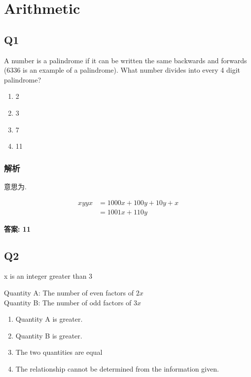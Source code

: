 \chapter{Arithmetic}

\section{Q1}

  A number is a palindrome if it can be written the same backwards and
  forwards (6336 is an example of a palindrome). What number divides into every
  4 digit palindrome?

  \begin{enumerate}
    \item 2
    \item 3
    \item 7
    \item 11
  \end{enumerate}

  \subsection{解析}

    意思为.

    \begin{align*}
      xyyx &= 1000x + 100y + 10y + x \\
      &= 1001x + 110 y
    \end{align*}

    \textbf{答案: 11}

\section{Q2}

  x is an integer greater than 3

  \begin{center}
    Quantity A: The number of even factors of $ 2x $ \\
    Quantity B: The number of odd factors of $ 3x $
  \end{center}

  \begin{enumerate}
    \item Quantity A is greater.
    \item Quantity B is greater.
    \item The two quantities are equal
    \item The relationship cannot be determined from the information given.
  \end{enumerate}

